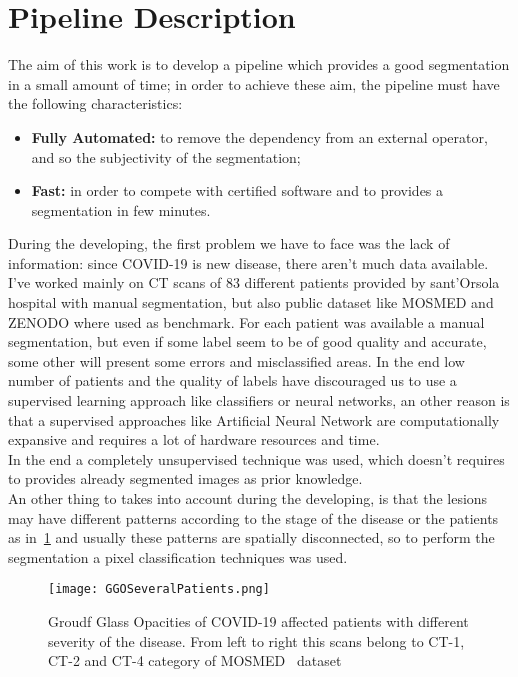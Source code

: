 
	
	\section{Pipeline Description}
	
	The aim of this work is to develop a pipeline which provides a good segmentation in a small amount of time; in order to achieve these aim, the pipeline must have the following characteristics:
	\begin{itemize}
		\item  \textbf{Fully Automated: } to remove the dependency from an external operator, and so the subjectivity of the segmentation; 
		
		\item \textbf{Fast: } in order to compete with certified software and to provides a segmentation in few minutes.
	\end{itemize}

	During the developing, the first problem we have to face was the lack of information: since COVID-19 is new disease, there aren't much data available. I've worked mainly on CT scans of 83 different patients provided by sant'Orsola hospital with manual segmentation, but also public dataset like MOSMED and ZENODO where used as benchmark. For each patient was available a manual segmentation, but even if some label seem to be of good quality and accurate, some other will present some errors and misclassified areas. In the end low number of patients and the quality of labels have discouraged us to use a supervised learning approach like classifiers or neural networks, an other reason is that a supervised approaches like Artificial Neural Network are computationally expansive and requires a lot of hardware resources and time.\\
	In the end a completely unsupervised technique was used, which doesn't requires to provides already segmented images as prior knowledge.\\
	An other thing to takes into account during the developing, is that the lesions may have different patterns according to the stage of the disease or the patients as in \figurename\,\ref{fig:GGO-Spatial} and usually these patterns are spatially disconnected, so to perform the segmentation a pixel classification techniques was used.
	
	\begin{figure}\label{fig:GGO-Spatial}
		\centering
		\texttt{[image: GGOSeveralPatients.png]}
		\caption{Groudf Glass Opacities of COVID-19 affected patients with different severity of the disease. From left to right this scans belong to CT-1, CT-2 and CT-4 category of MOSMED~\cite{DATA:MOSMED} dataset}
	\end{figure}
	
